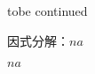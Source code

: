 \documentclass[windows,csize4,answers]{BHCexam}
\begin{document}
\begin{groups}
\begin{questions}[]
        
        tobe continued
        
        \question[5] 因式分解：$na$
        \begin{solution}{0.5cm}
            \methodonly $na$
        \end{solution}
        \vspace{3.5cm}




    \end{questions}

\end{groups}


\label{lastpage}
\end{document}
